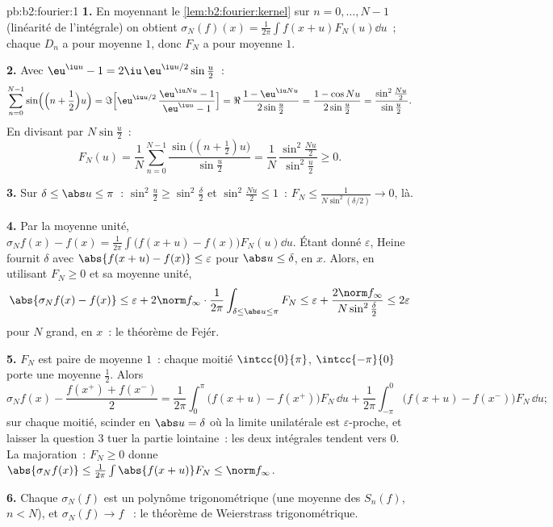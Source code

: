 \begin{solution}{pb:b2:fourier:1}
\textbf{1.} En moyennant le \cref{lem:b2:fourier:kernel} sur $n = 0,
\dots, N-1$ (linéarité de l'intégrale) on obtient $\sigma_N(f)(x) =
\frac{1}{2\pi}\int f(x+u)F_N(u)\dd u$~; chaque $D_n$ a pour moyenne
$1$, donc $F_N$ a pour moyenne $1$.

\textbf{2.} Avec $\eu^{\iu u} - 1 = 2\iu\,\eu^{\iu
u/2}\sin\frac u2$~:
\[
\sum_{n=0}^{N-1}\sin\Bigl(\Bigl(n + \frac12\Bigr)u\Bigr)
= \Im\Bigl[\eu^{\iu u/2}\,\frac{\eu^{\iu Nu} - 1}{\eu^{\iu u}
- 1}\Bigr]
= \Re\,\frac{1 - \eu^{\iu Nu}}{2\sin\frac u2}
= \frac{1 - \cos Nu}{2\sin\frac u2}
= \frac{\sin^2\frac{Nu}2}{\sin\frac u2} .
\]
En divisant par $N\sin\frac u2$~:
\[
F_N(u) = \frac1N\sum_{n=0}^{N-1}
\frac{\sin\bigl((n+\frac12)u\bigr)}{\sin\frac u2}
= \frac{1}{N}\,
\frac{\sin^2\frac{Nu}{2}}{\sin^2\frac u2} \geq 0 .
\]

\textbf{3.} Sur $\delta \leq \abs u \leq \pi$~: $\sin^2\frac u2
\geq \sin^2\frac\delta2$ et $\sin^2\frac{Nu}2 \leq 1$~: $F_N
\leq \frac{1}{N\sin^2(\delta/2)} \to 0$,  là.

\textbf{4.} Par la moyenne unité, $\sigma_Nf(x) - f(x) =
\frac{1}{2\pi}\int\bigl(f(x+u) - f(x)\bigr)F_N(u)\dd u$. Étant donné
$\varepsilon$, Heine fournit $\delta$ avec $\abs{f(x+u) - f(x)}
\leq \varepsilon$ pour $\abs u \leq \delta$,  en $x$.
Alors, en utilisant $F_N \geq 0$ et sa moyenne unité,
\[
\abs{\sigma_Nf(x) - f(x)}
\leq \varepsilon +
2\norm f_\infty\cdot\frac{1}{2\pi}
\int_{\delta\leq\abs u\leq\pi}F_N
\leq \varepsilon + \frac{2\norm
f_\infty}{N\sin^2\frac\delta2}
\leq 2\varepsilon
\]
pour $N$ grand,  en $x$~: le théorème de Fejér.

\textbf{5.} $F_N$ est paire de moyenne $1$~: chaque moitié
$\intcc{0}{\pi}$, $\intcc{-\pi}{0}$ porte une moyenne $\frac12$.
Alors
\[
\sigma_Nf(x) - \frac{f(x^+)+f(x^-)}{2}
= \frac{1}{2\pi}\int_0^\pi\bigl(f(x+u) -
f(x^+)\bigr)F_N\,\dd u
+ \frac{1}{2\pi}\int_{-\pi}^0\bigl(f(x+u) -
f(x^-)\bigr)F_N\,\dd u ;
\]
sur chaque moitié, scinder en $\abs u = \delta$ où la limite
unilatérale est $\varepsilon$-proche, et laisser la question 3 tuer
la partie lointaine~: les deux intégrales tendent vers $0$. La
majoration~: $F_N \geq 0$ donne $\abs{\sigma_Nf(x)} \leq
\frac{1}{2\pi}\int\abs{f(x+u)}F_N \leq \norm f_\infty$.

\textbf{6.} Chaque $\sigma_N(f)$ est un polynôme trigonométrique
(une moyenne des $S_n(f)$, $n < N$), et $\sigma_N(f) \to f$
~: le théorème de Weierstrass trigonométrique.


\end{solution}
